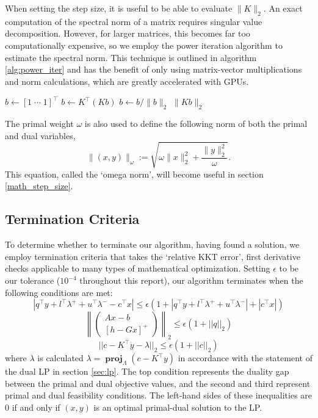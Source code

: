\documentclass[twoside,12pt,openright]{report}  %
\DeclareMathOperator*{\proj}{\textbf{proj}}
\begin{document}
When setting the step size, it is useful to be able to evaluate $\|K\|_2$. An exact computation of the spectral norm of a matrix requires singular value decomposition. However, for larger matrices, this becomes far too computationally expensive, so we employ the power iteration algorithm \cite{golub2013matrix} to estimate the spectral norm. This technique is outlined in algorithm \ref{alg:power_iter} and has the benefit of only using matrix-vector multiplications and norm calculations, which are greatly accelerated with GPUs.
\begin{algorithm}[H]
\begin{algorithmic}[1]
\caption{SpectralNormEstimate($K, N_{iter}$)\cite{golub2013matrix}}
\label{alg:power_iter}
    \State $b \leftarrow [1 \; \cdots \; 1]^\top$
    \State $b \leftarrow K^\top(Kb)$
    \State $b \leftarrow b/\|b\|_2$
    \EndFor
    \State \Return $\|Kb\|_2$
    
\end{algorithmic}
\end{algorithm}
The primal weight $\omega$ is also used to define the following norm of both the primal and dual variables,
\begin{equation}\|(x,y)\|_\omega :=\sqrt{\omega\|x\|_2^2 + \frac{\|y\|_2^2}{\omega}}.\end{equation}
This equation, called the `omega norm', will become useful in section \ref{math_step_size}.
\subsection{Termination Criteria}\label{sec:term}
To determine whether to terminate our algorithm, having found a solution, we employ termination criteria that takes the `relative KKT error', first derivative checks applicable to many types of mathematical optimization. Setting $\epsilon$ to be our tolerance ($10^{-4}$ throughout this report), our algorithm terminates when the following conditions are met:
\begin{equation}\label{term1}
|q^{\top}y + l^{\top}\lambda^{+}+u^{\top}\lambda^{-}-c^{\top}x| \leq \epsilon (1 + |q^{\top}y + l^{\top}\lambda^{+}+u^{\top}\lambda^{-}| + |c^\top x|)
\end{equation}
\begin{equation}\label{term2}\left\|\begin{pmatrix}
    Ax-b \\ [h-Gx]^+
\end{pmatrix}\right\|_2 \leq \epsilon (1 + ||q||_2)\end{equation}
\begin{equation}\label{term3}||c-K^\top y -\lambda||_2 \leq \epsilon (1+||c||_2)\end{equation}
where $\lambda$ is calculated $\lambda=\proj_\Lambda(c-K^\top y)$ in accordance with the statement of the dual LP in section \ref{sec:lp}. The top condition represents the duality gap between the primal and dual objective values, and the second and third represent primal and dual feasibility conditions. The left-hand sides of these inequalities are 0 if and only if $(x,y)$ is an optimal primal-dual solution to the LP.
\end{document}
